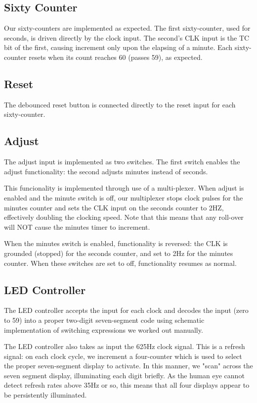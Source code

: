 \documentclass[paper=letter, fontsize=11pt]{scrartcl}
\begin{document}
\subsection{Sixty Counter}
Our sixty-counters are implemented as expected. The first sixty-counter, used for seconds, is driven directly by the clock input. The second's CLK input is the TC bit of the first, causing increment only upon the elapsing of a minute. Each sixty-counter resets when its count reaches 60 (passes 59), as expected.

\subsection{Reset}
The debounced reset button is connected directly to the reset input for each sixty-counter.

\subsection{Adjust}
The adjust input is implemented as two switches. The first switch enables the adjust functionality: the second adjusts minutes instead of seconds.

This funcionality is implemented through use of a multi-plexer. When adjust is enabled and the minute switch is off, our multiplexer stops clock pulses for the minutes counter and sets the CLK input on the seconds counter to 2HZ, effectively doubling the clocking speed. Note that this means that any roll-over will NOT cause the minutes timer to increment.

When the minutes switch is enabled, functionality is reversed: the CLK is grounded (stopped) for the seconds counter, and set to 2Hz for the minutes counter. When these switches are set to off, functionality resumes as normal.

\subsection{LED Controller}
The LED controller accepts the input for each clock and decodes the input (zero to 59) into a proper two-digit seven-segment code using schematic implementation of switching expressions we worked out manually.

The LED controller also takes as input the 625Hz clock signal. This is a refresh signal: on each clock cycle, we increment a four-counter which is used to select the proper seven-segment display to activate. In this manner, we "scan" across the seven segment display, illuminating each digit briefly. As the human eye cannot detect refresh rates above 35Hz or so, this means that all four displays appear to be persistently illuminated.
\end{document}
